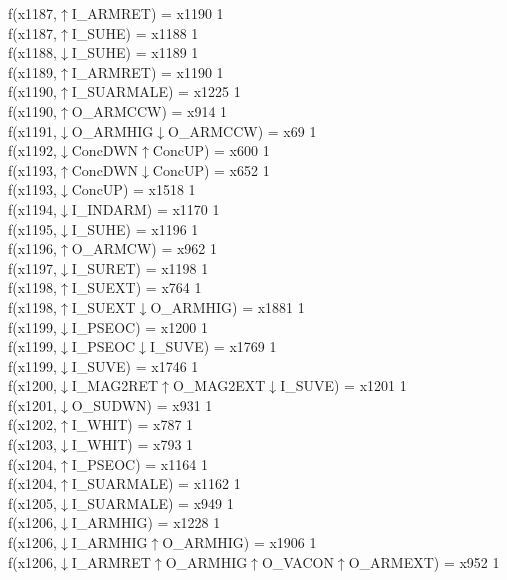 f(x1187,$\uparrow$I\_ARMRET) = x1190 {1} \\
f(x1187,$\uparrow$I\_SUHE) = x1188 {1} \\
f(x1188,$\downarrow$I\_SUHE) = x1189 {1} \\
f(x1189,$\uparrow$I\_ARMRET) = x1190 {1} \\
f(x1190,$\uparrow$I\_SUARMALE) = x1225 {1} \\
f(x1190,$\uparrow$O\_ARMCCW) = x914 {1} \\
f(x1191,$\downarrow$O\_ARMHIG$\downarrow$O\_ARMCCW) = x69 {1} \\
f(x1192,$\downarrow$ConcDWN$\uparrow$ConcUP) = x600 {1} \\
f(x1193,$\uparrow$ConcDWN$\downarrow$ConcUP) = x652 {1} \\
f(x1193,$\downarrow$ConcUP) = x1518 {1} \\
f(x1194,$\downarrow$I\_INDARM) = x1170 {1} \\
f(x1195,$\downarrow$I\_SUHE) = x1196 {1} \\
f(x1196,$\uparrow$O\_ARMCW) = x962 {1} \\
f(x1197,$\downarrow$I\_SURET) = x1198 {1} \\
f(x1198,$\uparrow$I\_SUEXT) = x764 {1} \\
f(x1198,$\uparrow$I\_SUEXT$\downarrow$O\_ARMHIG) = x1881 {1} \\
f(x1199,$\downarrow$I\_PSEOC) = x1200 {1} \\
f(x1199,$\downarrow$I\_PSEOC$\downarrow$I\_SUVE) = x1769 {1} \\
f(x1199,$\downarrow$I\_SUVE) = x1746 {1} \\
f(x1200,$\downarrow$I\_MAG2RET$\uparrow$O\_MAG2EXT$\downarrow$I\_SUVE) = x1201 {1} \\
f(x1201,$\downarrow$O\_SUDWN) = x931 {1} \\
f(x1202,$\uparrow$I\_WHIT) = x787 {1} \\
f(x1203,$\downarrow$I\_WHIT) = x793 {1} \\
f(x1204,$\uparrow$I\_PSEOC) = x1164 {1} \\
f(x1204,$\uparrow$I\_SUARMALE) = x1162 {1} \\
f(x1205,$\downarrow$I\_SUARMALE) = x949 {1} \\
f(x1206,$\downarrow$I\_ARMHIG) = x1228 {1} \\
f(x1206,$\downarrow$I\_ARMHIG$\uparrow$O\_ARMHIG) = x1906 {1} \\
f(x1206,$\downarrow$I\_ARMRET$\uparrow$O\_ARMHIG$\uparrow$O\_VACON$\uparrow$O\_ARMEXT) = x952 {1} \\
